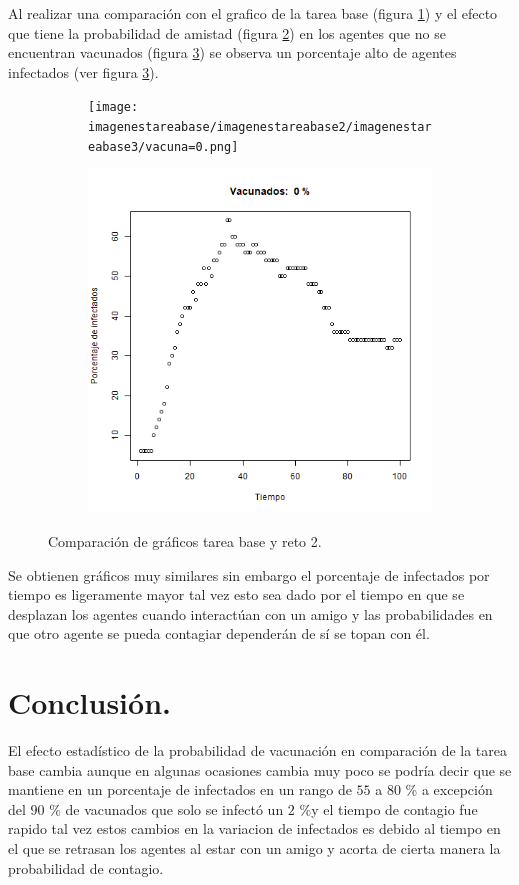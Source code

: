 \documentclass[a4paper]{article}
\begin{document}
\newpage
\justify Al realizar una comparación con el grafico de la tarea base (figura \ref{q12}) y  el efecto que tiene la probabilidad de amistad (figura \ref{q13}) en los agentes que no se encuentran vacunados (figura \ref{qwer}) se observa un porcentaje alto de agentes infectados (ver figura \ref{qwer}).
\begin{figure}[h!]
    \centering
\begin{subfigure}[b]{0.45\linewidth}
\texttt{[image: imagenestareabase/imagenestareabase2/imagenestareabase3/vacuna=0.png]}
\caption{}
\label{q12}
\end{subfigure}
\begin{subfigure}[b]{0.45\linewidth}
\includegraphics[width=\linewidth]{vacuna reto2.png}
\caption{}
\label{q13}
\end{subfigure}
\caption{Comparación de gráficos tarea base y reto 2.}
    \label{qwer}
\end{figure}

\justify Se obtienen gráficos muy similares  sin embargo el porcentaje de infectados por tiempo es ligeramente mayor tal vez esto sea dado por el tiempo en que se desplazan los agentes cuando interactúan con un amigo y las probabilidades en que otro agente se pueda contagiar dependerán de sí se topan con él.

\section{Conclusión.}
\justify El efecto estadístico de la probabilidad de vacunación en comparación de la tarea base cambia aunque en algunas ocasiones cambia muy poco se podría decir que se mantiene en un porcentaje de infectados en un rango de $55$ a $80$ \% a  excepción del $90$ $\%$ de vacunados que solo se infectó un $2$ $\% $y el tiempo de contagio fue rapido tal vez estos cambios en la variacion de infectados es debido al tiempo en el que se retrasan los agentes al estar con un amigo y acorta de cierta manera la probabilidad de contagio.  
\end{document}
